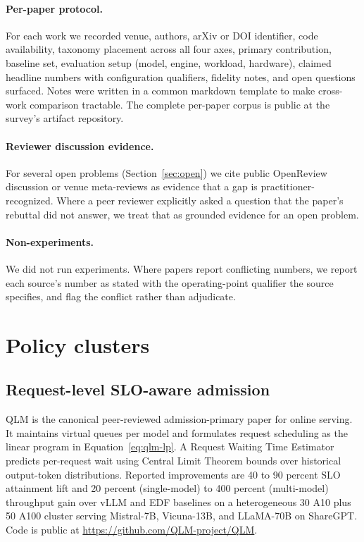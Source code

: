 \documentclass[11pt,letterpaper]{article}
\theoremstyle{definition}
\begin{document}
\paragraph{Per-paper protocol.} For each work we recorded venue,
authors, arXiv or DOI identifier, code availability, taxonomy
placement across all four axes, primary contribution, baseline set,
evaluation setup (model, engine, workload, hardware), claimed headline
numbers with configuration qualifiers, fidelity notes, and open
questions surfaced. Notes were written in a common markdown template
to make cross-work comparison tractable. The complete per-paper corpus
is public at the survey's artifact repository.

\paragraph{Reviewer discussion evidence.} For several open problems
(Section~\ref{sec:open}) we cite public OpenReview discussion or venue
meta-reviews as evidence that a gap is practitioner-recognized. Where
a peer reviewer explicitly asked a question that the paper's rebuttal
did not answer, we treat that as grounded evidence for an open
problem.

\paragraph{Non-experiments.} We did not run experiments. Where papers
report conflicting numbers, we report each source's number as stated
with the operating-point qualifier the source specifies, and flag the
conflict rather than adjudicate.

\section{Policy clusters}
\label{sec:clusters}

\subsection{Request-level SLO-aware admission}

QLM \cite{patke2024qlm} is the canonical peer-reviewed
admission-primary paper for online serving. It maintains virtual
queues per model and formulates request scheduling as the linear
program in Equation~\ref{eq:qlm-lp}. A Request Waiting Time Estimator
predicts per-request wait using Central Limit Theorem bounds over
historical output-token distributions. Reported improvements are 40 to
90 percent SLO attainment lift and 20 percent (single-model) to 400
percent (multi-model) throughput gain over vLLM and EDF baselines on a
heterogeneous 30 A10 plus 50 A100 cluster serving Mistral-7B,
Vicuna-13B, and LLaMA-70B on ShareGPT. Code is public at
\url{https://github.com/QLM-project/QLM}.
\end{document}
